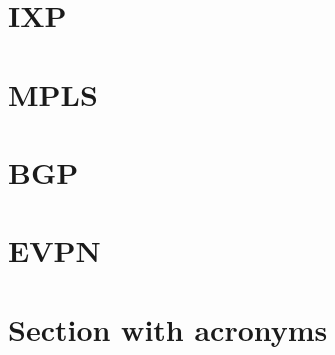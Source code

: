 \documentclass[a4paper,12pt,twoside,twocolumn,landscape]{book}
\begin{document}
\section{IXP}

\section{MPLS}

\section{BGP}

\section{EVPN}


\clearpage

\section*{Section with acronyms}

\printglossary[type=\acronymtype,title=Special Terms,toctitle=List of terms]


\renewcommand{\listfigurename}{List of {\footnotesize hidden} Figures}
\listoffigures


\renewcommand{\listtablename}{Tables {\footnotesize hidding} on the pages}
\listoftables




\end{document}
